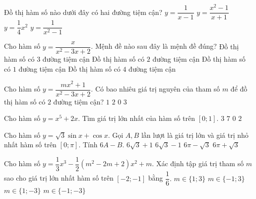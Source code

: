 \begin{ex}%
Đồ thị hàm số nào dưới đây có hai đường tiệm cận? 
\choice
{\True $y = \dfrac{1}{x-1}$}
{ $y = \dfrac{x^2-1}{x+1}$}
{ $y = \dfrac{1}{4}x^2$}
{ $y = \dfrac{1}{x^2-1}$}
\end{ex}

\begin{ex}%
Cho hàm số 
$y=\dfrac{x}{x^2-3x+2}$. Mệnh đề nào sau đây là mệnh đề đúng?
\choice
{\True   Đồ thị hàm số có $3$ đường tiệm cận}
{ Đồ thị hàm số có $2$ đường tiệm cận}
{Đồ thị hàm số có $1$ đường tiệm cận}
{Đồ thị hàm số có $4$ đường tiệm cận}
\end{ex}


\begin{ex}%
Cho hàm số $y=\dfrac{mx^2+1}{x^2-3x+2}$.  Có bao nhiêu giá trị nguyên của tham số $m$  để đồ thị hàm số có 
$2$  đường tiệm cận? 
\choice
{\True $1$}
{$2$}
{$0$}
{$3$}
\end{ex}



\begin{ex}%
Cho hàm số 
$y = x^5+2x$. Tìm giá trị lớn nhất của hàm số trên $[0;1]$.
\choice
{\True $3$}
{$7$}
{$0$}
{$2$}
\end{ex}

\begin{ex}%
Cho hàm số  $y=\sqrt{3}\sin x + \cos x$.  Gọi 
$A,B$ lần lượt là giá trị lớn và giá trị nhỏ nhất hàm số trên $[0;\pi]$.  Tính $6A-B$.
\choice
{\True $6\sqrt{3}+1$}
{ $6\sqrt{3}-1$}
{ $6\pi-\sqrt{3}$}
{ $6\pi+\sqrt{3}$}
\end{ex}


\begin{ex}%
Cho hàm số $y = \dfrac{1}{3}x^3-\dfrac{1}{2}(m^2-2m+2)x^2+m$. Xác định  tập giá trị tham số $m$  sao cho giá trị lớn nhất hàm số trên $[-2;-1]$  bằng $\dfrac{1}{6}.$
\choice
{\True $m \in \{1;3\}$}
{ $m \in \{-1;3\}$}
{ $m \in \{1;-3\}$}
{ $m \in \{-1;-3\}$}
\end{ex}




